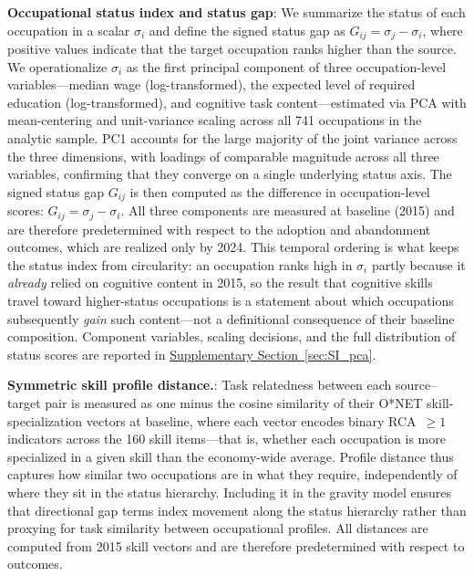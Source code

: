 \documentclass[11pt, letterpaper]{article} %
\begin{document}
\textbf{Occupational status index and status gap}: We summarize the status of each occupation in a scalar $\sigma_i$ and define the signed status gap as $G_{ij} = \sigma_j - \sigma_i$, where positive values indicate that the target occupation ranks higher than the source. We operationalize $\sigma_i$ as the first principal component of three occupation-level variables---median wage (log-transformed), the expected level of required education (log-transformed), and cognitive task content---estimated via PCA with mean-centering and unit-variance scaling across all 741 occupations in the analytic sample. PC1 accounts for the large majority of the joint variance across the three dimensions, with loadings of comparable magnitude across all three variables, confirming that they converge on a single underlying status axis. The signed status gap $G_{ij}$ is then computed as the difference in occupation-level scores: $G_{ij} = \sigma_j - \sigma_i$. All three components are measured at baseline (2015) and are therefore predetermined with respect to the adoption and abandonment outcomes, which are realized only by 2024. This temporal ordering is what keeps the status index from circularity: an occupation ranks high in $\sigma_i$ partly because it \emph{already} relied on cognitive content in 2015, so the result that cognitive skills travel toward higher-status occupations is a statement about which occupations subsequently \emph{gain} such content---not a definitional consequence of their baseline composition. Component variables, scaling decisions, and the full distribution of status scores are reported in \hyperref[sec:SI_pca]{Supplementary Section~\ref*{sec:SI_pca}}.

\textbf{Symmetric skill profile distance.}: Task relatedness between each source--target pair is measured as one minus the cosine similarity of their O*NET skill-specialization vectors at baseline, where each vector encodes binary RCA~$\geq 1$ indicators across the 160 skill items---that is, whether each occupation is more specialized in a given skill than the economy-wide average. Profile distance thus captures how similar two occupations are in what they require, independently of where they sit in the status hierarchy. Including it in the gravity model ensures that directional gap terms index movement along the status hierarchy rather than proxying for task similarity between occupational profiles. All distances are computed from 2015 skill vectors and are therefore predetermined with respect to outcomes.
 
\end{document}
